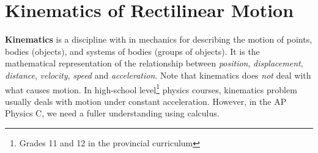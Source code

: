 \chapter{Kinematics of Rectilinear Motion}
\label{chapter:kinematics}


\textbf{Kinematics} is a discipline with in mechanics for describing the
motion of points, bodies (objects), and systems of bodies (groups of objects).
It is the mathematical representation of the relationship between
\emph{position}, \emph{displacement}, \emph{distance}, \emph{velocity},
\emph{speed} and \emph{acceleration}. Note that kinematics does \emph{not}
deal with what causes motion. In high-school level\footnote{Grades 11 and 12 in
  the provincial curriculum} physics courses, kinematics problem usually deals
with motion under constant acceleration. However, in the AP Physics C, we need
a fuller understanding using calculus.



